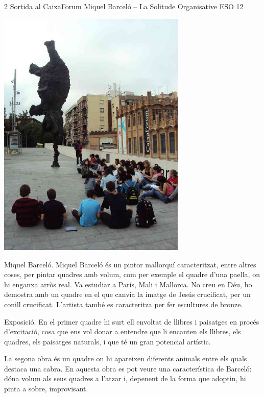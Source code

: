 %
%
\begin{news}
{2} %
{Sortida al CaixaForum}
{Miquel Barceló – La Solitude Organisative}
{ESO}
{12} %

\noindent\includegraphics[width=9cm,keepaspectratio]{eso/img/gen/barcelo_dpi_lowres.jpg}


Miquel Barceló.
Miquel Barceló és un pintor mallorquí caracteritzat, entre altres coses, per pintar quadres amb volum, com per exemple el quadre d'una paella, on hi enganxa arròs real. Va estudiar a París, Mali i Mallorca. No creu en Déu, ho demostra amb un quadre en el que canvia la imatge de Jesús crucificat, per un conill crucificat. L’artista també es caracteritza per fer escultures de bronze.

Exposició.
En el primer quadre hi surt ell envoltat de llibres i paisatges en procés d'excitació, cosa que ens vol donar a entendre que li encanten els llibres, els quadres, els paisatges naturals, i que té un gran potencial artístic.

La segona obra és un quadre on hi apareixen diferents animals entre els quals destaca una cabra. En aquesta obra es pot veure una característica de Barceló: dóna volum als seus quadres a l’atzar i, depenent de la forma que adoptin, hi pinta a sobre, improvisant.


\end{news}
